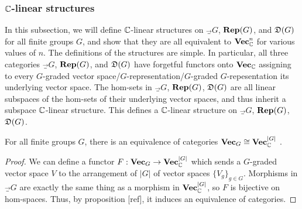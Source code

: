 \subsubsection{${\mathbb C}$-linear structures}
\label{C-linear-structures}

In this subsection, we will define ${\mathbb C}$-linear structures on $\Vec_G$, ${\bf Rep}(G)$, and ${\mathfrak D}(G)$ for all finite groups $G$, and show that they are all equivalent to ${\bf Vec}_{{\mathbb C}}^n$ for various values of $n$. The definitions of the structures are simple. In particular, all three categories $\Vec_G$, ${\bf Rep}(G)$, and ${\mathfrak D}(G)$ have forgetful functors onto ${\bf Vec}_{\mathbb C}$ assigning to every $G$-graded vector space/$G$-representation/$G$-graded $G$-repesentation its underlying vector space. The hom-sets in $\Vec_G$, ${\bf Rep}(G)$, ${\mathfrak D}(G)$ are all linear subspaces of the hom-sets of their underlying vector spaces, and thus inherit a subspace ${\mathbb C}$-linear structure. This defines a ${\mathbb C}$-linear structure on $\Vec_G$, ${\bf Rep}(G)$, ${\mathfrak D}(G)$.

\begin{prop} For all finite groups $G$, there is an equivalence of categories ${\bf Vec}_G\cong {\bf Vec}_{{\mathbb C}}^{|G|}$ .
\end{prop}
\begin{proof} We can define a functor $F:{\bf Vec}_G\to {\bf Vec}_{{\mathbb C}}^{|G|}$ which sends a $G$-graded vector space $V$ to the arrangement of $|G|$ of vector spaces $\{V_g\}_{g\in G}$. Morphisms in $\Vec_G$ are exactly the same thing as a morphism in ${\bf Vec}_{{\mathbb C}}^{|G|}$, so $F$ is bijective on hom-spaces. Thus, by proposition [ref], it induces an equivalence of categories.
\end{proof}

